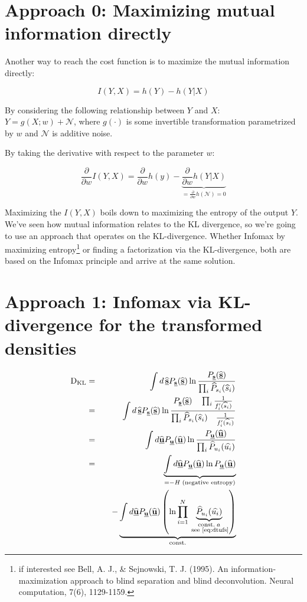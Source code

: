 \newpage

\section{Approach 0: Maximizing mutual information directly}

Another way to reach the cost function is to maximize the mutual information directly:

$$
I(Y,X) = h(Y) - h(Y|X)
$$

By considering the following relationship between $Y$ and $X$:\\
$Y = g(X;w) + \mathcal{N}$, where $g(\cdot)$ is some invertible transformation parametrized by $w$ and $\mathcal{N}$ is additive noise.

By taking the derivative with respect to the parameter $w$:

$$
\frac{\partial}{\partial w} I(Y,X) = \frac{\partial}{\partial w}h(y) - 
\underbrace{\frac{\partial}{\partial w} h(Y|X)}_{= \frac{\partial}{\partial w} h(\mathcal{N}) = 0}
$$

Maximizing the $I(Y,X)$ boils down to maximizing the entropy of the output $Y$. 
We've seen how mutual information relates to the KL divergence, so we're going to use an approach 
that operates on the KL-divergence. 
Whether Infomax by maximizing entropy\footnote{if interested see Bell, A. J., \& Sejnowski, T. J. (1995). An information-maximization approach to blind separation and blind deconvolution. Neural computation, 7(6), 1129-1159.} 
or finding a factorization via the KL-divergence,
both are based on the Infomax principle and arrive at the same solution.

\newpage

\section{Approach 1: Infomax via KL-divergence for the transformed densities}
\begin{eqnarray}
  \dkl & = & \int d \, \widehat{\vec{s}} P_{\vec{s}}(\widehat{\vec{s}}) \ln \frac{P_{\vec{s}}(\widehat{\vec{s}})}{\prod_i \widehat{P}_{s_i}(\widehat{s}_i)}\\
  & = &  \int d \, \widehat{\vec{s}} P_{\vec{s}}(\widehat{\vec{s}}) \ln 
  \frac
  {P_{\vec{s}}(\widehat{\vec{s}}) \quad \prod_i \frac{1}{f_i' (\widehat{s}_i)}}
  {\prod_i \widehat{P}_{s_i}(\widehat{s}_i) \quad \frac{1}{f_i' (\widehat{s}_i)}} \\
  & = & \int d \widehat{\vec{u}} P_{\vec{u}} (\widehat{\vec{u}}) 
  \ln 
  \frac
  {P_{\vec{u}} (\widehat{\vec{u}}) }
  {\prod_i  \widehat{P}_{u_i}(\widehat{u_i})} \\
  & = & 
  \underbrace{
	  \int d \widehat{\vec{u}} P_{\vec{u}} (\widehat{\vec{u}}) 
	  \ln 
	  {P_{\vec{u}} (\widehat{\vec{u}}) }
  }_{= -H \; \text{(negative entropy)}}\\
  & & \quad -
  \underbrace{
	  \int d \widehat{\vec{u}} P_{\vec{u}} (\widehat{\vec{u}}) 
	  \left( \ln
	  {\prod_{i=1}^{N}
	  \underbrace{ 
		\widehat{P}_{u_i}(\widehat{u_i}) 
	  }_{\substack{\text{const.\;} a \\\text{\;see \eqref{eq:dtufs}}}}} 
	  \right)
	  }_{\text{const.}}
\end{eqnarray}

